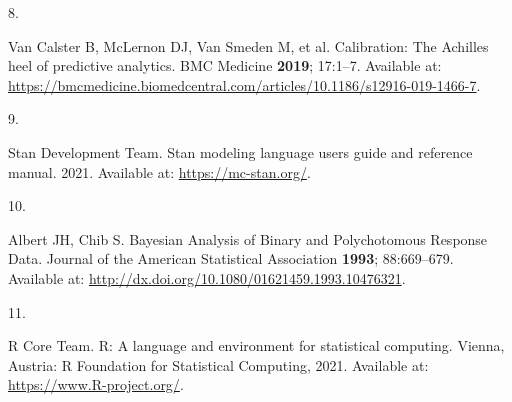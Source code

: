 \documentclass[
]{article}
\newlength{\cslhangindent}
\newlength{\csllabelwidth}
\newlength{\cslentryspacingunit} %
\newenvironment{CSLReferences}[2] %
 {%
  \setlength{\parindent}{0pt}
  \ifodd #1
  \let\oldpar\par
  \def\par{\hangindent=\cslhangindent\oldpar}
  \fi
  \setlength{\parskip}{#2\cslentryspacingunit}
 }%
 {}
\newcommand{\CSLLeftMargin}[1]{\parbox[t]{\csllabelwidth}{#1}}
\newcommand{\CSLRightInline}[1]{\parbox[t]{\linewidth - \csllabelwidth}{#1}\break}
\begin{document}
\begin{CSLReferences}{0}{0}
\leavevmode{}%
\CSLLeftMargin{8. }
\CSLRightInline{Van Calster B, McLernon DJ, Van Smeden M, et al. {Calibration: The Achilles heel of predictive analytics}. BMC Medicine \textbf{2019}; 17:1--7. Available at: \url{https://bmcmedicine.biomedcentral.com/articles/10.1186/s12916-019-1466-7}.}

\leavevmode{}%
\CSLLeftMargin{9. }
\CSLRightInline{Stan Development Team. Stan modeling language users guide and reference manual. 2021. Available at: \url{https://mc-stan.org/}.}

\leavevmode{}%
\CSLLeftMargin{10. }
\CSLRightInline{Albert JH, Chib S. Bayesian Analysis of Binary and Polychotomous Response Data. Journal of the American Statistical Association \textbf{1993}; 88:669--679. Available at: \url{http://dx.doi.org/10.1080/01621459.1993.10476321}.}

\leavevmode{}%
\CSLLeftMargin{11. }
\CSLRightInline{R Core Team. R: A language and environment for statistical computing. Vienna, Austria: R Foundation for Statistical Computing, 2021. Available at: \url{https://www.R-project.org/}.}

\end{CSLReferences}

\newpage

\singlespacing
\providecommand{\docline}[3]{\noalign{\global\setlength{\arrayrulewidth}{#1}}\arrayrulecolor[HTML]{#2}\cline{#3}}

\setlength{\tabcolsep}{2pt}

\renewcommand*{\arraystretch}{1.5}
\end{document}
